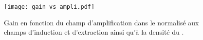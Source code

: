       \begin{figure}[htbp]
        \centering
        \texttt{[image: gain\_vs\_ampli.pdf]}
        \caption[Gain en fonction du champ d'amplification]{\label{fig::gain_vs_ampli}Gain en fonction du champ d'amplification dans le \TOO{} normalisé aux champs d'induction et d'extraction ainsi qu'à la densité du \threeL{}.}
      \end{figure}
%

